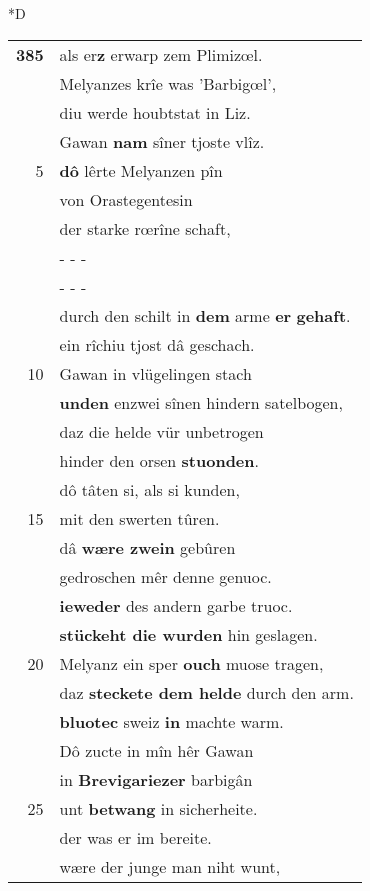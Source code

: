 \documentclass[8pt,a4paper,notitlepage]{article}
\begin{document}
\begin{table}[ht]
\begin{minipage}[t]{0.5\linewidth}
\small
\begin{center}*D
\end{center}
\begin{tabular}{rl}
\textbf{385} & als er\textbf{z} erwarp zem Plimizœl.\\ 
 & Melyanzes krîe was 'Barbigœl',\\ 
 & diu werde houbtstat in Liz.\\ 
 & Gawan \textbf{nam} sîner tjoste vlîz.\\ 
5 & \textbf{dô} lêrte Melyanzen pîn\\ 
 & von Orastegentesin\\ 
 & der starke rœrîne schaft,\\ 
 & \multicolumn{1}{l}{ - - - }\\ 
 & \multicolumn{1}{l}{ - - - }\\ 
 & durch den schilt in \textbf{dem} arme \textbf{er} \textbf{gehaft}.\\ 
 & ein rîchiu tjost dâ geschach.\\ 
10 & Gawan in vlügelingen stach\\ 
 & \textbf{unden} enzwei sînen hindern satelbogen,\\ 
 & daz die helde vür unbetrogen\\ 
 & hinder den orsen \textbf{stuonden}.\\ 
 & dô tâten si, als si kunden,\\ 
15 & mit den swerten tûren.\\ 
 & dâ \textbf{wære zwein} gebûren\\ 
 & gedroschen mêr denne genuoc.\\ 
 & \textbf{ieweder} des andern garbe truoc.\\ 
 & \textbf{stückeht die wurden} hin geslagen.\\ 
20 & Melyanz ein sper \textbf{ouch} muose tragen,\\ 
 & daz \textbf{steckete dem helde} durch den arm.\\ 
 & \textbf{bluotec} sweiz \textbf{in} machte warm.\\ 
 & Dô zucte in mîn hêr Gawan\\ 
 & in \textbf{Brevigariezer} barbigân\\ 
25 & unt \textbf{betwang} in sicherheite.\\ 
 & der was er im bereite.\\ 
 & wære der junge man niht wunt,\\ 

\end{tabular}
\end{minipage}
\end{table}
\end{document}
